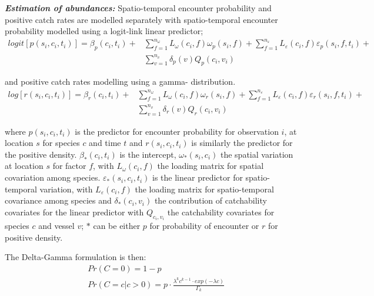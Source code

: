 \documentclass{nature}
\begin{document}
\begin{linenumbers}
\textbf{\textit{Estimation of abundances:}} Spatio-temporal encounter
probability and positive catch rates are modelled separately with
spatio-temporal encounter probability modelled using a logit-link linear
predictor;
		\begin{equation}
			\begin{split}
			logit[p(s_{i},c_{i},t_{i})] =	\beta_{p}(c_{i},t_{i}) +
			& \sum\limits_{f=1}^{n_{\omega}} L_{\omega}(c_{i},f)
			\omega_{p}(s_{i},f) + \sum\limits_{f=1}^{n_{\varepsilon}}
			L_{\varepsilon}(c_{i},f) \varepsilon_{p}(s_{i},f,t_{i}) + \\ 
			& \sum\limits_{v=1}^{n_{v}}\delta_{p}(v)Q_{p}(c_{i}, v_{i})
		\end{split}
		\end{equation}

and positive catch rates modelling using a gamma- distribution\cite{Thorson2015a}. 
		\begin{equation}
			\begin{split}
			log[r(s_{i},c_{i},t_{i})] = \beta_{r}(c_{i},t_{i}) +
			& \sum\limits_{f=1}^{n_{\omega}} L_{\omega}(c_{i},f)
			\omega_{r}(s_{i},f) +\sum\limits_{f=1}^{n_{\varepsilon}} 
			L_{\varepsilon}(c_{i},f) \varepsilon_{r}(s_{i},f,t_{i}) + \\
			& \sum\limits_{v=1}^{n_{v}}\delta_{r}(v) Q_{r}(c_{i}, v_{i})
			\end{split}
		\end{equation}

where $p(s_{i}, c_{i}, t_{i})$ is the predictor for encounter probability for
observation $i$, at location $s$ for species $c$ and time $t$ and
$r(s_{i}, c_{i}, t_{i})$ is similarly the predictor for the positive density.
$\beta_{*}(c_{i},t_{i})$ is the intercept, $\omega_{*}(s_{i},c_{i})$ the
spatial variation at location $s$ for factor $f$, with $L_{\omega}(c_{i},f)$
the loading matrix for spatial covariation among species.
$\varepsilon_{*}(s_{i},c_{i},t_{i})$ is the linear predictor for
spatio-temporal variation, with $L_{\varepsilon}(c_{i}, f)$ the loading matrix
for spatio-temporal covariance among species and $\delta_{*}(c_{i},
v_{i})$ the contribution of catchability covariates for the linear predictor
with $Q_{c_{i}, v_{i}}$ the catchability covariates for species $c$ and
vessel $v$;  $*$ can be either $p$ for probability of encounter or $r$ for
positive density.

The Delta-Gamma formulation is then:
\begin{equation}
	\begin{split}
	& Pr(C = 0) = 1 - p \\
	& Pr(C = c | c > 0) = p \cdot \frac{\lambda^{k}c^{k-1} \cdot exp(-\lambda c)}{\Gamma_{k}}
	\end{split}
\end{equation}


\end{linenumbers}
\end{document}
